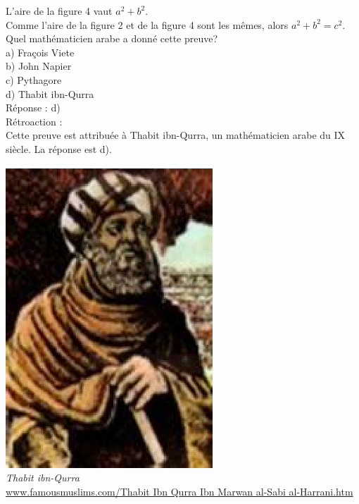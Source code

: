 \documentclass[letterpaper, 12pt]{article}
\begin{document}
L'aire de la figure 4 vaut $a^{2} + b^{2}$.\\

Comme l'aire de la figure 2 et de la figure 4 sont les m\^emes, alors $a^{2} + b^{2} = c^{2}$.\\

Quel math\'ematicien arabe a donn\'e cette preuve?\\

a) Fra\c cois Viete\\
b) John Napier\\
c) Pythagore\\
d) Thabit ibn-Qurra\\

R\'eponse : d)\\

R\'etroaction :\\
Cette preuve est attribu\'ee \`a Thabit ibn-Qurra, un math\'ematicien arabe du {\scriptsize IX\ieme{}} si\`ecle. La r\'eponse est d).\\
\begin{center}
\includegraphics[scale=0.7]{thabit.eps}\\
\emph{{\small Thabit ibn-Qurra}}\\
\href{http://www.famousmuslims.com/Thabit Ibn Qurra Ibn Marwan al-Sabi al-Harrani.htm}{www.famousmuslims.com/Thabit Ibn Qurra Ibn Marwan al-Sabi al-Harrani.htm}\\[5mm]
\end{center}
\end{document}
